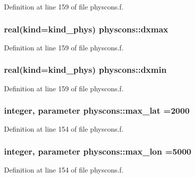 Definition at line 159 of file physcons.\+f.

\subsubsection[{\texorpdfstring{dxmax}{dxmax}}]{\setlength{\rightskip}{0pt plus 5cm}real(kind=kind\+\_\+phys) physcons\+::dxmax}\hypertarget{namespacephyscons_a58cc4eb8ab140d1d56e8e1f2cad4aa93}{}\label{namespacephyscons_a58cc4eb8ab140d1d56e8e1f2cad4aa93}


Definition at line 159 of file physcons.\+f.

\subsubsection[{\texorpdfstring{dxmin}{dxmin}}]{\setlength{\rightskip}{0pt plus 5cm}real(kind=kind\+\_\+phys) physcons\+::dxmin}\hypertarget{namespacephyscons_a0d975826ce89583acdad7f32e028d979}{}\label{namespacephyscons_a0d975826ce89583acdad7f32e028d979}


Definition at line 159 of file physcons.\+f.

\subsubsection[{\texorpdfstring{max\+\_\+lat}{max_lat}}]{\setlength{\rightskip}{0pt plus 5cm}integer, parameter physcons\+::max\+\_\+lat =2000}\hypertarget{namespacephyscons_a954d523a6dc3fe558de54a03b584e512}{}\label{namespacephyscons_a954d523a6dc3fe558de54a03b584e512}


Definition at line 154 of file physcons.\+f.

\subsubsection[{\texorpdfstring{max\+\_\+lon}{max_lon}}]{\setlength{\rightskip}{0pt plus 5cm}integer, parameter physcons\+::max\+\_\+lon =5000}\hypertarget{namespacephyscons_afd0d42b08acf830fce089278841f35d8}{}\label{namespacephyscons_afd0d42b08acf830fce089278841f35d8}


Definition at line 154 of file physcons.\+f.

